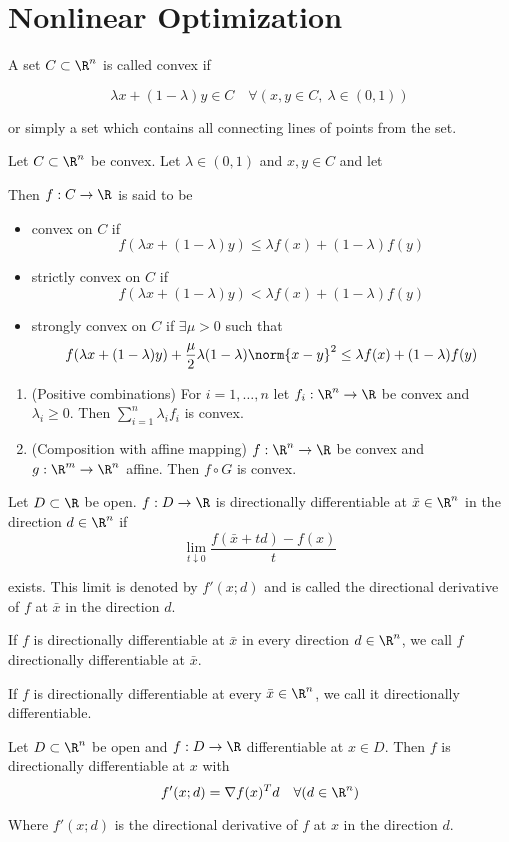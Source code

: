 
\section{Nonlinear Optimization}\label{d1c9db1}


A set $C\subset\R^n$ is called convex if

$$
	\lambda x+(1-\lambda)y\in C\quad
	\forall(x,y\in C,\ \lambda \in(0,1))
$$

or simply a set which contains all connecting lines of points from the
set.


Let $C\subset\R^n$ be convex. Let $\lambda\in(0,1)$ and $x,y\in C$ and
let

Then $f:C\to\R$ is said to be

\begin{itemize}
	\item convex on $C$ if
	      $$f(\lambda x+(1-\lambda)y)\leq\lambda f(x)+(1-\lambda)f(y)$$
	\item strictly convex on $C$ if
	      $$f(\lambda x+(1-\lambda)y)<\lambda f(x)+(1-\lambda)f(y)$$
	\item strongly convex on $C$ if $\exists\mu>0$ such that
	      $$f(\lambda x+(1-\lambda)y)+\frac{\mu}{2}\lambda(1-\lambda)\norm{x-y}^2\leq\lambda f(x)+(1-\lambda)f(y)$$
\end{itemize}


\begin{enumerate}
	\item (Positive combinations) For $i=1,\ldots,n$ let $f_i:\R^n\to\R$ be
	      convex and $\lambda_i\geq0$. Then $\sum_{i=1}^n\lambda_if_i$ is
	      convex.
	\item (Composition with affine mapping) $f:\R^n\to\R$ be convex
	      and $g:\R^m\to\R^n$ affine. Then $f\circ G$ is convex.
\end{enumerate}


Let $D\subset \R$ be open. $f:D\to\R$ is directionally differentiable
at $\bar x\in\R^n$ in the direction $d\in\R^n$ if
$$
	\lim_{t\downarrow0}\frac{f(\bar x+td)-f(x)}t
$$

exists. This limit is denoted by $f'(x;d)$ and is called the
directional derivative of $f$ at $\bar x$ in the direction $d$.

If $f$ is directionally differentiable at $\bar x$ in every direction
$d\in\R^n$, we call $f$ directionally differentiable at $\bar x$.

If $f$ is directionally differentiable at every $\bar x\in\R^n$, we
call it directionally differentiable.


Let $D\subset \R^n$ be open and $f:D\to\R$
differentiable at $x\in D$. Then $f$ is directionally differentiable
at $x$ with
$$
	f'(x;d)=\nabla f(x)^Td\quad\forall(d\in\R^n)
$$

Where $f'(x;d)$ is the directional derivative of $f$ at $x$ in the
direction $d$.
